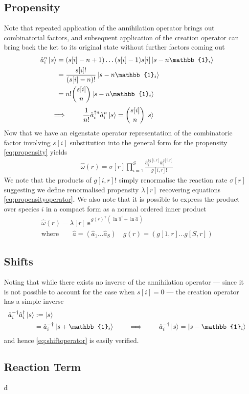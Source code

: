 \documentclass{article}[12pt]
\numberwithin{equation}{section}
\begin{document}
\subsection{Propensity}
Note that repeated application of the annihilation operator brings
out combinatorial factors, and subsequent application of the
creation operator can bring back the ket to its original state without
further factors coming out
\begin{align*}
		\hat{a}_i^n\ket{s}
		&=(s[i]-n+1)\dots(s[i]-1)s[i]\ket{s-n\mathbb{1}_i}\\
		&=\frac{s[i]!}{(s[i]-n)!}\ket{s-n\mathbb{1}_i}\\
		&=n!{s[i] \choose n}\ket{s-n\mathbb{1}_i}
\end{align*}
\vspace{-30pt}
\begin{align}
		\implies\qquad\frac{1}{n!}\hat{a}_i^{\dagger n}\hat{a}_i^n\ket{s}
		&={s[i] \choose n}\ket{s}\qquad\qquad\qquad
\end{align}
Now that we have an eigenstate operator representation of the combinatoric
factor involving $s[i]$ substitution into the general form for the propensity
\eqref{eq:propensity} yields
\begin{align*}
	\hat\omega(r)=
	\sigma[r]
		\prod_{i=1}^S
		\frac{\hat{a}_i^{\dagger g[i,r]}\hat{a}_i^{g[i,r]}}{g[i,r]!}
\end{align*}
We note that the products of $g[i,r]!$ simply renormalise the reaction rate
$\sigma[r]$ suggesting we define renormalised propensity $\lambda[r]$ recovering
equations \eqref{eq:propensityoperator}. We also note that it is possible to
express the product over species $i$ in a compact form as a normal ordered inner
product
\begin{align}
	\hat\omega(r)=
	\lambda[r]\,
		\mathbb{e}^{\,g(r)^{\top}\left(\,\ln\hat{a}^{\dagger}+\ln\hat{a} \,\right)}
		\qquad\qquad\quad\\
		\text{where}\qquad
		\hat{a}=(\hat{a}_1\dots \hat{a}_S)\quad
		g(r)=(g[1,r]\dots g[S,r])
\end{align}
\subsection{Shifts}
\vspace{-10pt}
Noting that while there exists no inverse of the annihilation operator --- since
it is not possible to account for the case when $s[i]=0$ --- the creation
operator has a simple inverse
\begin{align*}
	\hat{a}_i^{-\dagger}\hat{a}_i^{\dagger}\ket{s}
	& :=\ket{s}\\
	&=\hat{a}_i^{-\dagger}\ket{s+\mathbb{1}_i}
	\qquad\implies\qquad
	\hat{a}_i^{-\dagger}\ket{s}
	=\ket{s-\mathbb{1}_i}
\end{align*}
and hence \eqref{eq:shiftoperator} is easily verified.
\subsection{Reaction Term}
d
\end{document}
